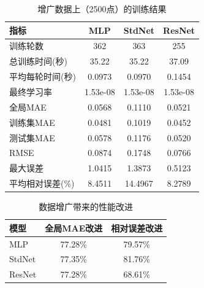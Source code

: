 \documentclass[11pt]{article}
\begin{document}
\begin{table}[htbp]
    \centering
    \caption{增广数据上（2500点）的训练结果}
    \label{tab:results_round2}
    \begin{tabular}{lccc}
        \toprule
        \textbf{指标} & \textbf{MLP} & \textbf{StdNet} & \textbf{ResNet} \\
        \midrule
        训练轮数        & 362          & 363             & 255             \\
        总训练时间(秒)    & 35.22        & 35.22           & 37.09           \\
        平均每轮时间(秒)   & 0.0973       & 0.0970          & 0.1454          \\
        最终学习率       & 1.53e-08     & 1.53e-08        & 1.53e-08        \\
        全局MAE       & 0.0568       & 0.1110          & 0.0521          \\
        训练集MAE      & 0.0481       & 0.1019          & 0.0452          \\
        测试集MAE      & 0.0578       & 0.1176          & 0.0520          \\
        RMSE        & 0.0874       & 0.1748          & 0.0766          \\
        最大误差        & 1.0415       & 1.3873          & 0.5123          \\
        平均相对误差(\%)  & 8.4511       & 14.4967         & 8.2789          \\
        \bottomrule
    \end{tabular}
\end{table}

\begin{table}[htbp]
    \centering
    \caption{数据增广带来的性能改进}
    \label{tab:improvement}
    \begin{tabular}{lcc}
        \toprule
        \textbf{模型} & \textbf{全局MAE改进} & \textbf{相对误差改进} \\
        \midrule
        MLP         & 77.28\%          & 79.57\%         \\
        StdNet      & 77.35\%          & 81.76\%         \\
        ResNet      & 77.28\%          & 68.61\%         \\
        \bottomrule
    \end{tabular}
\end{table}
\end{document}
